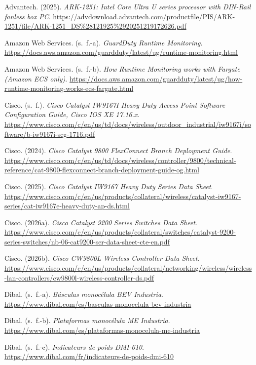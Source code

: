 \begin{list}{}{\setlength{\leftmargin}{1.27cm}\setlength{\itemindent}{-1.27cm}\setlength{\itemsep}{0.5\baselineskip}\raggedright}
\item Advantech. (2025). \textit{ARK-1251: Intel Core Ultra U series processor with DIN-Rail fanless box PC}. \url{https://advdownload.advantech.com/productfile/PIS/ARK-1251/file/ARK-1251_DS%28121925%2920251219172626.pdf}
\item Amazon Web Services. (s.~f.-a). \textit{GuardDuty Runtime Monitoring}. \url{https://docs.aws.amazon.com/guardduty/latest/ug/runtime-monitoring.html}
\item Amazon Web Services. (s.~f.-b). \textit{How Runtime Monitoring works with Fargate (Amazon ECS only)}. \url{https://docs.aws.amazon.com/guardduty/latest/ug/how-runtime-monitoring-works-ecs-fargate.html}
\item Cisco. (s.~f.). \textit{Cisco Catalyst IW9167I Heavy Duty Access Point Software Configuration Guide, Cisco IOS XE 17.16.x}. \url{https://www.cisco.com/c/en/us/td/docs/wireless/outdoor_industrial/iw9167i/software/b-iw9167i-scg-1716.pdf}
\item Cisco. (2024). \textit{Cisco Catalyst 9800 FlexConnect Branch Deployment Guide}. \url{https://www.cisco.com/c/en/us/td/docs/wireless/controller/9800/technical-reference/cat-9800-flexconnect-branch-deployment-guide-og.html}
\item Cisco. (2025). \textit{Cisco Catalyst IW9167 Heavy Duty Series Data Sheet}. \url{https://www.cisco.com/c/en/us/products/collateral/wireless/catalyst-iw9167-series/cat-iw9167e-heavy-duty-ap-ds.html}
\item Cisco. (2026a). \textit{Cisco Catalyst 9200 Series Switches Data Sheet}. \url{https://www.cisco.com/c/en/us/products/collateral/switches/catalyst-9200-series-switches/nb-06-cat9200-ser-data-sheet-cte-en.pdf}
\item Cisco. (2026b). \textit{Cisco CW9800L Wireless Controller Data Sheet}. \url{https://www.cisco.com/c/en/us/products/collateral/networking/wireless/wireless-lan-controllers/cw9800l-wireless-controller-ds.pdf}
\item Dibal. (s.~f.-a). \textit{Básculas monocélula BEV Industria}. \url{https://www.dibal.com/es/basculas-monocelula-bev-industria}
\item Dibal. (s.~f.-b). \textit{Plataformas monocélula ME Industria}. \url{https://www.dibal.com/es/plataformas-monocelula-me-industria}
\item Dibal. (s.~f.-c). \textit{Indicateurs de poids DMI-610}. \url{https://www.dibal.com/fr/indicateurs-de-poids-dmi-610}

\end{list}
